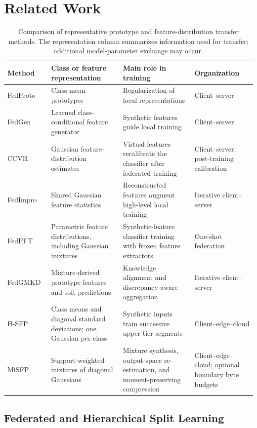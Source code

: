 \section{Related Work}
\label{sec:related}
\begin{table}[t]
\caption{Comparison of representative prototype and feature-distribution transfer methods. The representation column summarizes information used for transfer; additional model-parameter exchange may occur.}
\label{tab:extension}
\centering
\small
\setlength{\tabcolsep}{4pt}
\begin{tabularx}{\textwidth}{@{}p{2.05cm}XXp{2.55cm}@{}}
\toprule
Method & Class or feature representation & Main role in training & Organization\\
\midrule
FedProto~\cite{tan2022fedproto} & Class-mean prototypes & Regularization of local representations & Client--server\\
FedGen~\cite{zhu2021data} & Learned class-conditional feature generator & Synthetic features guide local training & Client--server\\
CCVR~\cite{luo2021ccvr} & Gaussian feature-distribution estimates & Virtual features recalibrate the classifier after federated training & Client--server; post-training calibration\\
FedImpro~\cite{tang2024fedimpro} & Shared Gaussian feature statistics & Reconstructed features augment high-level local training & Iterative client--server\\
FedPFT~\cite{beitollahi2025fedpft} & Parametric feature distributions, including Gaussian mixtures & Synthetic-feature classifier training with frozen feature extractors & One-shot federation\\
FedGMKD~\cite{zhang2024fedgmkd} & Mixture-derived prototype features and soft predictions & Knowledge alignment and discrepancy-aware aggregation & Iterative client--server\\
H-SFP~\cite{tran2026h} & Class means and diagonal standard deviations; one Gaussian per class & Synthetic inputs train successive upper-tier segments & Client--edge--cloud\\
MiSFP & Support-weighted mixtures of diagonal Gaussians & Mixture synthesis, output-space re-estimation, and moment-preserving compression & Client--edge--cloud; optional boundary byte budgets\\
\bottomrule
\end{tabularx}
\end{table}
\subsection{Federated and Hierarchical Split Learning}

